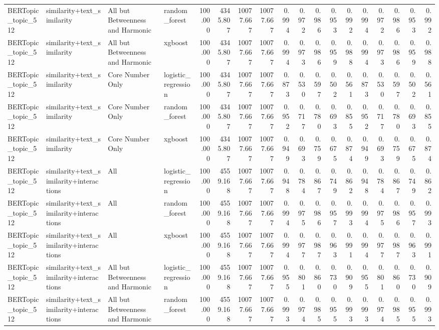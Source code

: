 \begin{tabular}{llllrrrrrrrrrrrrrr}
BERTopic_topic_512 & similarity+text_similarity & All but Betweenness and Harmonic & random_forest & 100.000 & 4345.807 & 10077.667 & 10077.667 & 0.994 & 0.972 & 0.986 & 0.953 & 0.992 & 0.994 & 0.972 & 0.986 & 0.953 & 0.992 \\
BERTopic_topic_512 & similarity+text_similarity & All but Betweenness and Harmonic & xgboost & 100.000 & 4345.807 & 10077.667 & 10077.667 & 0.994 & 0.973 & 0.986 & 0.959 & 0.988 & 0.994 & 0.973 & 0.986 & 0.959 & 0.988 \\
BERTopic_topic_512 & similarity+text_similarity & Core Number Only & logistic_regression & 100.000 & 4345.807 & 10077.667 & 10077.667 & 0.873 & 0.530 & 0.597 & 0.502 & 0.561 & 0.873 & 0.530 & 0.597 & 0.502 & 0.561 \\
BERTopic_topic_512 & similarity+text_similarity & Core Number Only & random_forest & 100.000 & 4345.807 & 10077.667 & 10077.667 & 0.952 & 0.717 & 0.780 & 0.693 & 0.855 & 0.952 & 0.717 & 0.780 & 0.693 & 0.855 \\
BERTopic_topic_512 & similarity+text_similarity & Core Number Only & xgboost & 100.000 & 4345.807 & 10077.667 & 10077.667 & 0.949 & 0.693 & 0.759 & 0.675 & 0.874 & 0.949 & 0.693 & 0.759 & 0.675 & 0.874 \\
BERTopic_topic_512 & similarity+text_similarity+interactions & All & logistic_regression & 100.000 & 4559.168 & 10077.667 & 10077.667 & 0.948 & 0.784 & 0.867 & 0.749 & 0.862 & 0.948 & 0.784 & 0.867 & 0.749 & 0.862 \\
BERTopic_topic_512 & similarity+text_similarity+interactions & All & random_forest & 100.000 & 4559.168 & 10077.667 & 10077.667 & 0.994 & 0.975 & 0.986 & 0.957 & 0.993 & 0.994 & 0.975 & 0.986 & 0.957 & 0.993 \\
BERTopic_topic_512 & similarity+text_similarity+interactions & All & xgboost & 100.000 & 4559.168 & 10077.667 & 10077.667 & 0.994 & 0.977 & 0.987 & 0.963 & 0.991 & 0.994 & 0.977 & 0.987 & 0.963 & 0.991 \\
BERTopic_topic_512 & similarity+text_similarity+interactions & All but Betweenness and Harmonic & logistic_regression & 100.000 & 4559.168 & 10077.667 & 10077.667 & 0.955 & 0.801 & 0.860 & 0.730 & 0.909 & 0.955 & 0.801 & 0.860 & 0.730 & 0.909 \\
BERTopic_topic_512 & similarity+text_similarity+interactions & All but Betweenness and Harmonic & random_forest & 100.000 & 4559.168 & 10077.667 & 10077.667 & 0.993 & 0.974 & 0.985 & 0.955 & 0.993 & 0.993 & 0.974 & 0.985 & 0.955 & 0.993 \\

\end{tabular}
